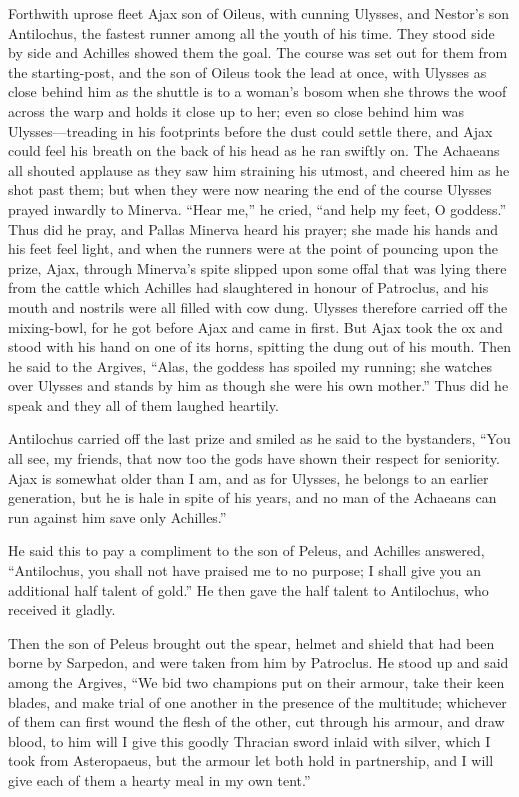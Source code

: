 Forthwith uprose fleet Ajax son of Oileus, with cunning Ulysses, and
Nestor’s son Antilochus, the fastest runner among all the youth of his
time. They stood side by side and Achilles showed them the goal. The
course was set out for them from the starting-post, and the son of Oileus
took the lead at once, with Ulysses as close behind him as the shuttle is
to a woman’s bosom when she throws the woof across the warp and holds it
close up to her; even so close behind him was Ulysses—treading in
his footprints before the dust could settle there, and Ajax could feel his
breath on the back of his head as he ran swiftly on. The Achaeans all
shouted applause as they saw him straining his utmost, and cheered him as
he shot past them; but when they were now nearing the end of the course
Ulysses prayed inwardly to Minerva. “Hear me,” he cried, “and help my
feet, O goddess.” Thus did he pray, and Pallas Minerva heard his prayer;
she made his hands and his feet feel light, and when the runners were at
the point of pouncing upon the prize, Ajax, through Minerva’s spite
slipped upon some offal that was lying there from the cattle which
Achilles had slaughtered in honour of Patroclus, and his mouth and
nostrils were all filled with cow dung. Ulysses therefore carried off the
mixing-bowl, for he got before Ajax and came in first. But Ajax took the
ox and stood with his hand on one of its horns, spitting the dung out of
his mouth. Then he said to the Argives, “Alas, the goddess has spoiled my
running; she watches over Ulysses and stands by him as though she were his
own mother.” Thus did he speak and they all of them laughed heartily.

Antilochus carried off the last prize and smiled as he said to the
bystanders, “You all see, my friends, that now too the gods have shown
their respect for seniority. Ajax is somewhat older than I am, and as for
Ulysses, he belongs to an earlier generation, but he is hale in spite of
his years, and no man of the Achaeans can run against him save only
Achilles.”

He said this to pay a compliment to the son of Peleus, and Achilles
answered, “Antilochus, you shall not have praised me to no purpose; I
shall give you an additional half talent of gold.” He then gave the half
talent to Antilochus, who received it gladly.

Then the son of Peleus brought out the spear, helmet and shield that had
been borne by Sarpedon, and were taken from him by Patroclus. He stood up
and said among the Argives, “We bid two champions put on their armour,
take their keen blades, and make trial of one another in the presence of
the multitude; whichever of them can first wound the flesh of the other,
cut through his armour, and draw blood, to him will I give this goodly
Thracian sword inlaid with silver, which I took from Asteropaeus, but the
armour let both hold in partnership, and I will give each of them a hearty
meal in my own tent.”

